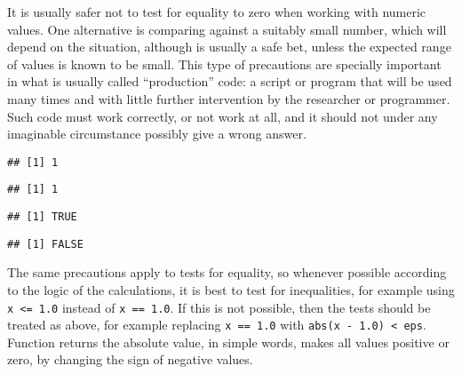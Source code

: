 \documentclass[paper=a4,headsepline,BCOR=12mm,twoside,open=right,%
titlepage,headings=small,fontsize=10pt,index=totoc,bibliography=totoc,%
captions=tableheading,captions=nooneline]{scrbook}\usepackage{knitr}
\begin{document}
It is usually safer not to test for equality to zero when working with numeric values. One alternative is comparing against a suitably small number, which will depend on the situation, although  is usually a safe bet, unless the expected range of values is known to be small. This type of precautions are specially important in what is usually called ``production'' code: a script or program that will be used many times and with little further intervention by the researcher or programmer. Such code must work correctly, or not work at all, and it should not under any imaginable circumstance possibly give a wrong answer.

\begin{knitrout}\footnotesize
{}\color{fgcolor}\begin{kframe}
\begin{alltt}
 \hlkwb{<-} \hlopt{$}
\hlstd{(}\hlopt{-}\hlstd{)}
\end{alltt}
\begin{verbatim}
## [1] 1
\end{verbatim}
\begin{alltt}
\hlstd{(}\hlstd{)}
\end{alltt}
\begin{verbatim}
## [1] 1
\end{verbatim}
\begin{alltt}
 \hlkwb{<-} 
 \hlopt{<}  \hlopt{*} 
\end{alltt}
\begin{verbatim}
## [1] TRUE
\end{verbatim}
\begin{alltt}
 \hlopt{<} 
\end{alltt}
\begin{verbatim}
## [1] FALSE
\end{verbatim}
\end{kframe}
\end{knitrout}

The same precautions apply to tests for equality, so whenever possible according to the logic of the calculations, it is best to test for inequalities, for example using \verb|x <= 1.0| instead of \verb|x == 1.0|. If this is not possible, then the tests should be treated as above, for example replacing \verb|x == 1.0| with \verb|abs(x - 1.0) < eps|. Function  returns the absolute value, in simple words, makes all values positive or zero, by changing the sign of negative values.
\end{document}
